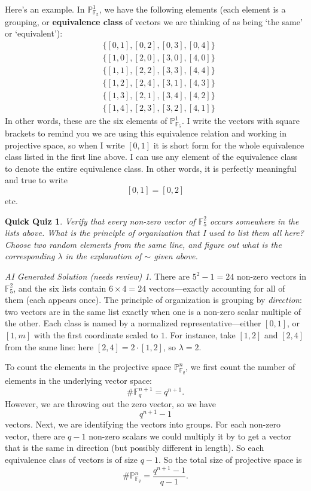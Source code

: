 \documentclass{article}
\theoremstyle{plain}
\newtheorem{quiz}[theorem]{Quick Quiz}
\theoremstyle{definition}
\theoremstyle{remark}
\newtheorem*{aisolution}{AI Generated Solution (needs review)}
\numberwithin{theorem}{section}
\newcommand{\FF}{\mathbb{F}}
\newcommand{\PP}{\mathbb{P}}
\begin{document}
Here's an example.  In $\PP^1_{\FF_5}$, we have the following elements (each element is a grouping, or \textbf{equivalence class} of vectors we are thinking of as being `the same' or `equivalent'):
\begin{align*}
&\{ [0,1], [0,2], [0,3], [0,4] \} \\
&\{ [1,0], [2,0], [3,0], [4,0] \} \\
&\{ [1,1], [2,2], [3,3], [4,4] \} \\
&\{ [1,2], [2,4], [3,1], [4,3] \} \\
&\{ [1,3], [2,1], [3,4], [4,2] \} \\
&\{ [1,4], [2,3], [3,2], [4,1] \} 
\end{align*}
In other words, these are the six elements of $\PP^1_{\FF_5}$.  I write the vectors with square brackets to remind you we are using this equivalence relation and working in projective space, so when I write $[0,1]$ it is short form for the whole equivalence class listed in the first line above.  I can use any element of the equivalence class to denote the entire equivalence class.  In other words, it is perfectly meaningful and true to write
\[
[0,1] = [0,2]
\]
etc.

\begin{quiz}
    Verify that every non-zero vector of $\FF_5^2$ occurs somewhere in the lists above.  What is the principle of organization that I used to list them all here?  Choose two random elements from the same line, and figure out what is the corresponding $\lambda$ in the explanation of $\sim$ given above.
\end{quiz}
\begin{aisolution}
There are $5^2 - 1 = 24$ non-zero vectors in $\FF_5^2$, and the six lists contain $6 \times 4 = 24$ vectors---exactly accounting for all of them (each appears once).  The principle of organization is grouping by \emph{direction}: two vectors are in the same list exactly when one is a non-zero scalar multiple of the other.  Each class is named by a normalized representative---either $[0,1]$, or $[1,m]$ with the first coordinate scaled to $1$.  For instance, take $[1,2]$ and $[2,4]$ from the same line: here $[2,4] = 2\cdot[1,2]$, so $\lambda = 2$.
\end{aisolution}

To count the elements in the projective space $\PP^n_{\FF_q}$, we first count the number of elements in the underlying vector space:
\[
\# \FF_q^{n+1} = q^{n+1}.
\]
However, we are throwing out the zero vector, so we have
\[
q^{n+1}-1
\]
vectors.  Next, we are identifying the vectors into groups.  For each non-zero vector, there are $q-1$ non-zero scalars we could multiply it by to get a vector that is the same in direction (but possibly different in length).  So each equivalence class of vectors is of size $q-1$.  So the total size of projective space is
\[
\# \PP^n_{\FF_q} = \frac{q^{n+1}-1}{q-1}.
\]
\end{document}
